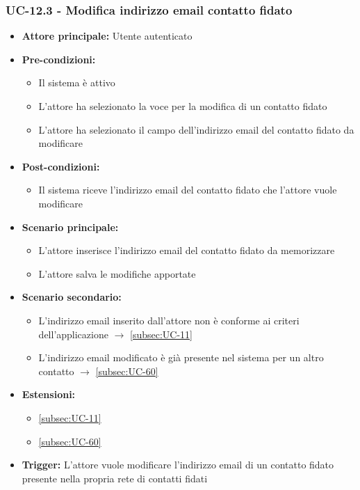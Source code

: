 \documentclass[a4paper,12pt]{article}
\begin{document}
\subsubsection{UC-12.3 - Modifica indirizzo email contatto fidato} \label{subsec:UC-12.3}
\begin{itemize}
    \item \textbf{Attore principale:} Utente autenticato
    \item \textbf{Pre-condizioni:}
    \begin{itemize}
        \item Il sistema è attivo
        \item L'attore ha selezionato la voce per la modifica di un contatto fidato
        \item L'attore ha selezionato il campo dell'indirizzo email del contatto fidato da modificare
    \end{itemize}
    \item \textbf{Post-condizioni:} 
    \begin{itemize}
        \item Il sistema riceve l'indirizzo email del contatto fidato che l'attore vuole modificare
    \end{itemize}
    \item \textbf{Scenario principale:} 
    \begin{itemize}
        \item L'attore inserisce l'indirizzo email del contatto fidato da memorizzare
        \item L'attore salva le modifiche apportate
    \end{itemize}
    \item \textbf{Scenario secondario:}
    \begin{itemize}
        \item L'indirizzo email inserito dall'attore non è conforme ai criteri dell'applicazione $\rightarrow$ \ref{subsec:UC-11}
        \item L'indirizzo email modificato è già presente nel sistema per un altro contatto $\rightarrow$ \ref{subsec:UC-60}
    \end{itemize}
    \item \textbf{Estensioni:}
    \begin{itemize}
        \item \ref{subsec:UC-11}
        \item \ref{subsec:UC-60}
    \end{itemize}
    \item \textbf{Trigger:} L'attore vuole modificare l'indirizzo email di un contatto fidato presente nella propria rete di contatti fidati
\end{itemize}
\end{document}

